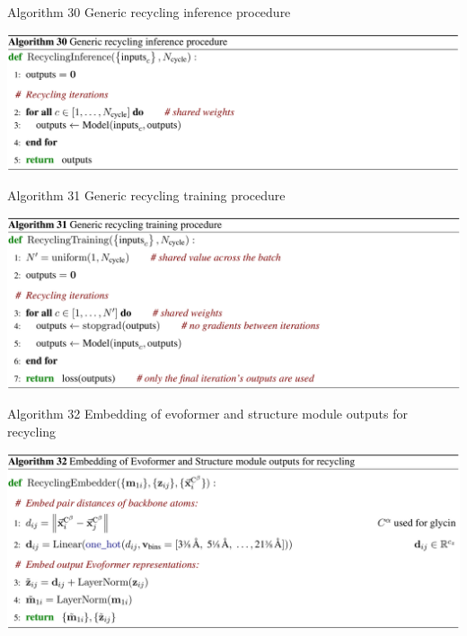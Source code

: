 \documentclass[presentation, smaller]{beamer}
\begin{document}
\begin{frame}[label={sec:org2e7db2e}]{Algorithm 30 Generic recycling inference procedure \cite{jumperHighlyAccurateProtein2021}}
\begin{center}
\includegraphics[width=.9\linewidth]{./imgs/algo30_recycling.png}
\end{center}
\end{frame}
\begin{frame}[label={sec:org968da3d}]{Algorithm 31 Generic recycling training procedure \cite{jumperHighlyAccurateProtein2021}}
\begin{center}
\includegraphics[width=.9\linewidth]{./imgs/algo31_generic-recycling.png}
\end{center}
\end{frame}
\begin{frame}[label={sec:orgf6640fb}]{Algorithm 32 Embedding of evoformer and structure module outputs for recycling \cite{jumperHighlyAccurateProtein2021}}
\begin{center}
\includegraphics[width=.9\linewidth]{./imgs/algo32_recycling-embedding.png}
\end{center}
\end{frame}
\end{document}
